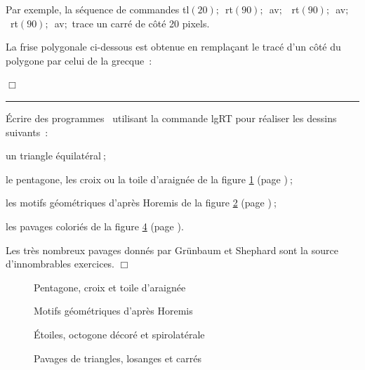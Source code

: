  Par exemple, la séquence de commandes {\idt tl$(20);$\ }{\idt rt$(90);$\ }{\idt av$;$\ }
{\idt rt$(90);$\ }{\idt av$;$\ }{\idt rt$(90);$\ }{\idt av$;$} trace un carré de côté
20 pixels.
\begin{exemple}{\rm
La frise polygonale ci-dessous est ob\-te\-nue en remplaçant le tracé
d'un côté du polygone par celui de la grecque~:

\vspace{\baselineskip}


\noindent $\Box$ }\end{exemple}
\noindent \rule{137mm}{0.1mm} %
\begin{exercices}{Écrire des programmes \pascal\  utilisant la commande {\idt lgRT}
pour réaliser les dessins suivants~:

\tiret un triangle équilatéral$\:$;

\tiret le pentagone, les croix ou la toile d'araignée de la figure \ref{fig:PtCrCrTa} (page \pageref{fig:PtCrCrTa})$\:$;

\tiret les motifs géométriques d'après Horemis \cite{horemis} de la figure \ref{fig:horemis} (page \pageref{fig:horemis})$\:$;

\tiret les pavages coloriés de la figure \ref{fig:pavtrilo} (page \pageref{fig:pavtrilo}).

Les très nombreux pavages donnés par Grünbaum et Shephard \cite{grunbaum} sont la source
d'innombrables exercices.
\noindent $\Box$}\end{exercices}
\begin{figure}[htbp]
 \caption{Pentagone, croix et toile d'araignée}\label{fig:PtCrCrTa}
\end{figure}
\begin{figure}[htbp]
 \caption{Motifs géométriques d'après Horemis}\label{fig:horemis}
\end{figure}
\begin{figure}[htbp]
 \caption{Étoiles, octogone décoré et spirolatérale}\label{fig:etocsp}
\end{figure}
\begin{figure}[htbp]
 \caption{Pavages de triangles, losanges et carrés}\label{fig:pavtrilo}
\end{figure}

